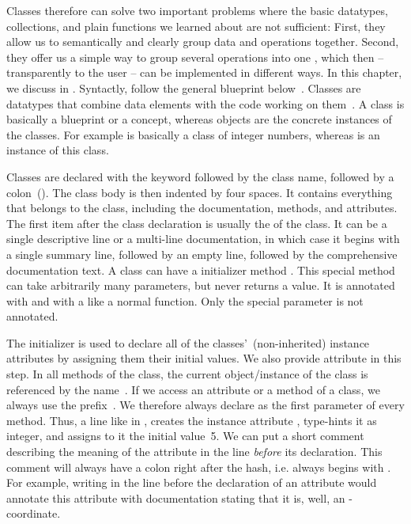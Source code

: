 Classes therefore can solve two important problems where the basic datatypes, collections, and plain functions we learned about are not sufficient:
First, they allow us to semantically and clearly group data and operations together.
Second, they offer us a simple way to group several operations into one , which then -- transparently to the user -- can be implemented in different ways.
In this chapter, we discuss  in \python.
Syntactly,  follow the general blueprint below~\cite{PSF:P3D:TPT:C}.%
%
%
\FloatBarrier%
%
Classes are datatypes that combine data elements with the code working on them~\cite{PSF:P3D:TPT:C}.
A class is basically a blueprint or a concept, whereas objects are the concrete instances of the classes.
For example  is basically a class of integer numbers, whereas  is an instance of this class.

Classes are declared with the keyword  followed by the class name, followed by a colon~(\inQuotes{:}).
The class body is then indented by four spaces.
It contains everything that belongs to the class, including the documentation, methods, and attributes.
The first item after the class declaration is usually the  of the class.
It can be a single descriptive line or a multi-line documentation, in which case it begins with a single summary line, followed by an empty line, followed by the comprehensive documentation text.
%
%
%
A class can have a initializer method .
This special method can take arbitrarily many parameters, but never returns a value.
It is annotated with  and with a  like a normal function.
Only the special parameter  is not annotated.

The initializer  is used to declare all of the classes'~(non-inherited) instance attributes by assigning them their initial values.
We also provide attribute  in this step.
In all methods of the class, the current object/instance of the class is referenced by the name~.
If we access an attribute or a method of a class, we always use the prefix~.
We therefore always declare  as the first parameter of every method.
Thus, a line like  in , creates the instance attribute , type-hints it as integer, and assigns to it the initial value~5.
We can put a short comment describing the meaning of the attribute in the line \emph{before} its declaration.
This comment will always have a colon right after the hash, i.e. always begins with \pythonil{\#: }\cite{SD2024SIDFD:DCAD}.
For example, writing  in the line before the declaration of an attribute  would annotate this attribute with documentation stating that it is, well, an -coordinate.

